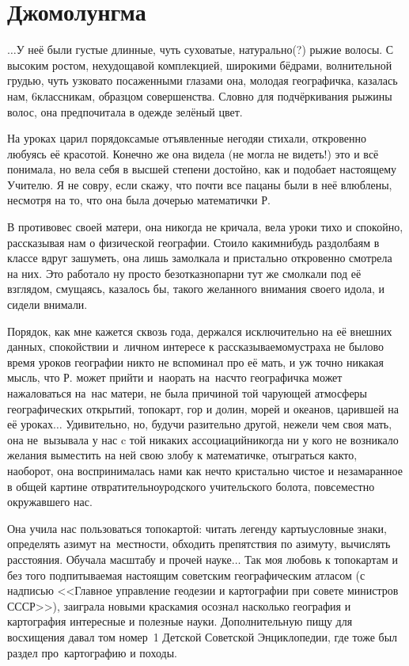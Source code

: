 \newpage
\section*{Джомолунгма}

$\ldots$У неё были густые длинные, чуть суховатые, натурально(?) рыжие волосы. С высоким ростом, нехудощавой комплекцией, широкими бёдрами, волнительной грудью, чуть узковато посаженными глазами она, молодая географичка, казалась нам, 6\sdash классникам, образцом совершенства. Словно для подчёркивания рыжины волос, она предпочитала в одежде зелёный цвет. 

На уроках царил порядок\mdash самые отъявленные негодяи стихали, откровенно любуясь её красотой. Конечно же она видела (не могла не видеть!) это и всё понимала, но вела себя в высшей степени достойно, как и подобает настоящему Учителю. Я не совру, если скажу, что почти все пацаны были в неё влюблены, несмотря на то, что она была дочерью математички Р.

В противовес своей матери, она никогда не кричала, вела уроки тихо и спокойно, рассказывая нам о физической географии. Стоило каким\sdash нибудь раздолбаям в классе вдруг зашуметь, она лишь замолкала и пристально откровенно смотрела на них. Это работало ну просто безотказно\mdash парни тут же смолкали под её взглядом, смущаясь, казалось бы, такого желанного внимания своего идола, и сидели внимали. 

Порядок, как мне кажется сквозь года, держался исключительно на её внешних данных, спокойствии и~личном интересе к рассказываемому\mdash страха не было\mdash во время уроков географии никто не вспоминал про её мать, и уж точно никакая мысль, что Р. может прийти и~наорать на~нас\mdash что географичка может нажаловаться на~нас матери, не была причиной той чарующей атмосферы географических открытий, топокарт, гор и долин, морей и океанов, царившей на её уроках$\ldots$ Удивительно, но, будучи разительно другой, нежели чем своя мать, она не~вызывала у нас c той никаких ассоциаций\mdash никогда ни у кого не возникало желания выместить на ней свою злобу к математичке, отыграться как\sdash то, наоборот, она воспринималась нами как нечто кристально чистое и незамаранное в общей картине отвратительно\sdash уродского учительского болота, повсеместно окружавшего нас.
 
Она учила нас пользоваться топокартой: читать легенду карты\mdash условные знаки, определять азимут на~местности, обходить препятствия по азимуту, вычислять расстояния. Обучала масштабу и прочей науке$\ldots$ Так моя любовь к топокартам и без того подпитываемая настоящим советским географическим атласом (с надписью <<Главное управление геодезии и картографии при совете министров СССР>>), заиграла новыми красками\mdash я осознал насколько география и картография интересные и полезные науки. Дополнительную пищу для восхищения давал том номер~1 Детской Советской Энциклопедии, где тоже был раздел про~картографию и походы. 

